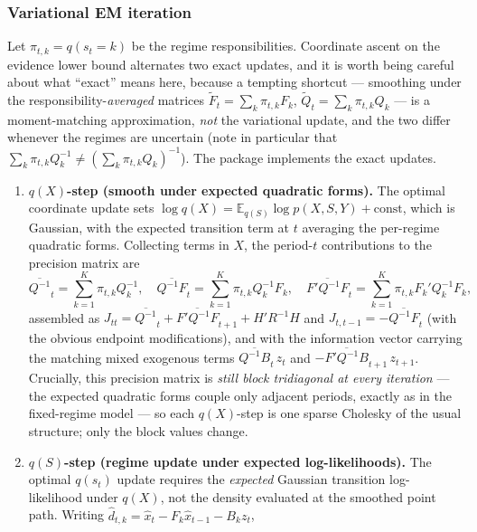\documentclass[11pt]{article}
\newcommand{\E}{\mathbb E}
\begin{document}
\subsubsection{Variational EM iteration}

Let $\pi_{t,k}=q(s_t=k)$ be the regime responsibilities.  Coordinate
ascent on the evidence lower bound alternates two exact updates, and
it is worth being careful about what ``exact'' means here, because a
tempting shortcut --- smoothing under the responsibility-\emph{averaged}
matrices $\widetilde F_t=\sum_k\pi_{t,k}F_k$,
$\widetilde Q_t=\sum_k\pi_{t,k}Q_k$ --- is a moment-matching
approximation, \emph{not} the variational update, and the two differ
whenever the regimes are uncertain (note in particular that
$\sum_k\pi_{t,k}Q_k^{-1}\neq(\sum_k\pi_{t,k}Q_k)^{-1}$).  The package
implements the exact updates.
\begin{enumerate}[leftmargin=2em]
\item \textbf{$q(X)$-step (smooth under expected quadratic forms).}
  The optimal coordinate update sets
  $\log q(X)=\E_{q(S)}\log p(X,S,Y)+\text{const}$, which is Gaussian,
  with the expected transition term at $t$ averaging the per-regime
  quadratic forms.  Collecting terms in $X$, the period-$t$
  contributions to the precision matrix are
  \begin{equation}
  \overline{Q^{-1}}_t=\sum_{k=1}^K \pi_{t,k}Q_k^{-1},
  \quad
  \overline{Q^{-1}F}_t=\sum_{k=1}^K \pi_{t,k}Q_k^{-1}F_k,
  \quad
  \overline{F'Q^{-1}F}_t=\sum_{k=1}^K \pi_{t,k}F_k'Q_k^{-1}F_k,
  \end{equation}
  assembled as
  $J_{tt}=\overline{Q^{-1}}_t+\overline{F'Q^{-1}F}_{t+1}+H'R^{-1}H$
  and $J_{t,t-1}=-\overline{Q^{-1}F}_t$ (with the obvious endpoint
  modifications), and with the information vector carrying the
  matching mixed exogenous terms
  $\overline{Q^{-1}B}_t\,z_t$ and $-\overline{F'Q^{-1}B}_{t+1}\,z_{t+1}$.
  Crucially, this precision matrix is \emph{still block tridiagonal at
  every iteration} --- the expected quadratic forms couple only
  adjacent periods, exactly as in the fixed-regime model --- so each
  $q(X)$-step is one sparse Cholesky of the usual structure; only the
  block values change.
\item \textbf{$q(S)$-step (regime update under expected
  log-likelihoods).}  The optimal $q(s_t)$ update requires the
  \emph{expected} Gaussian transition log-likelihood under $q(X)$,
  not the density evaluated at the smoothed point path.  Writing
  $\widehat d_{t,k}=\widehat x_t-F_k\widehat x_{t-1}-B_kz_t$,
  \begin{equation}

\end{equation}
\end{enumerate}
\end{document}
